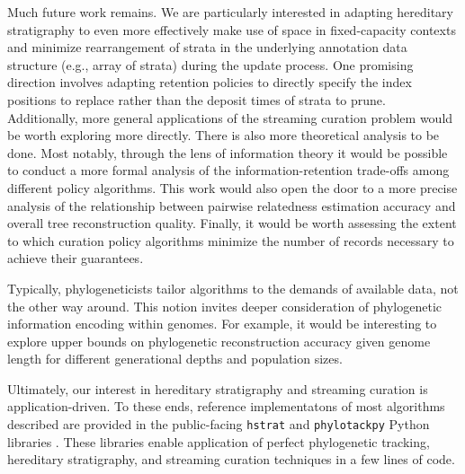 Much future work remains.
We are particularly interested in adapting hereditary stratigraphy to even more effectively make use of space in fixed-capacity contexts and minimize rearrangement of strata in the underlying annotation data structure (e.g., array of strata) during the update process.
One promising direction involves adapting retention policies to directly specify the index positions to replace rather than the deposit times of strata to prune.
Additionally, more general applications of the streaming curation problem would be worth exploring more directly.
There is also more theoretical analysis to be done.
Most notably, through the lens of information theory it would be possible to conduct a more formal analysis of the information-retention trade-offs among different policy algorithms. 
This work would also open the door to a more precise analysis of the relationship between pairwise relatedness estimation accuracy and overall tree reconstruction quality.
Finally, it would be worth assessing the extent to which curation policy algorithms minimize the number of records necessary to achieve their guarantees.

Typically, phylogeneticists tailor algorithms to the demands of available data, not the other way around.
This notion invites deeper consideration of phylogenetic information encoding within genomes.
For example, it would be interesting to explore upper bounds on phylogenetic reconstruction accuracy given genome length for different generational depths and population sizes.

Ultimately, our interest in hereditary stratigraphy and streaming curation is application-driven.
To these ends, reference implementatons of most algorithms described are provided in the public-facing \texttt{hstrat} and \texttt{phylotackpy} Python libraries \citep{moreno2022hstrat, dolson2023phylotrackpy}.
These libraries enable application of perfect phylogenetic tracking, hereditary stratigraphy, and streaming curation techniques in a few lines of code.
